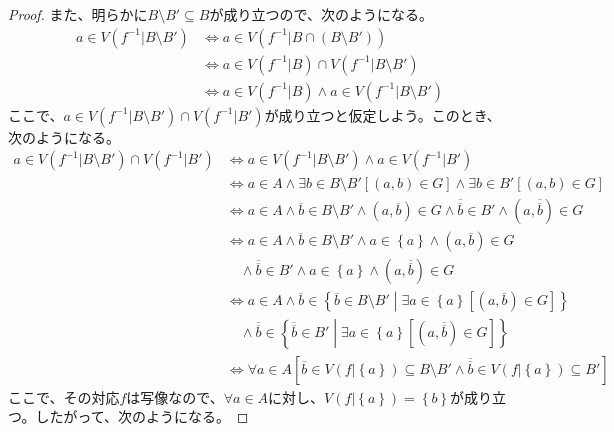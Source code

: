 \documentclass[a4paper]{jsarticle}
\begin{document}
\begin{proof}
また、明らかに$B \setminus B' \subseteq B$が成り立つので、次のようになる。
\begin{align*}
a \in V\left( f^{- 1}|B \setminus B' \right) &\Leftrightarrow a \in V\left( f^{- 1}|B \cap \left( B \setminus B' \right) \right)\\
&\Leftrightarrow a \in V\left( f^{- 1}|B \right) \cap V\left( f^{- 1}|B \setminus B' \right)\\
&\Leftrightarrow a \in V\left( f^{- 1}|B \right) \land a \in V\left( f^{- 1}|B \setminus B' \right)
\end{align*}
ここで、$a \in V\left( f^{- 1}|B \setminus B' \right) \cap V\left( f^{- 1}|B' \right)$が成り立つと仮定しよう。このとき、次のようになる。
\begin{align*}
a \in V\left( f^{- 1}|B \setminus B' \right) \cap V\left( f^{- 1}|B' \right) &\Leftrightarrow a \in V\left( f^{- 1}|B \setminus B' \right) \land a \in V\left( f^{- 1}|B' \right)\\
&\Leftrightarrow a \in A \land \exists b \in B \setminus B'\left[ (a,b) \in G \right] \land \exists b \in B'\left[ (a,b) \in G \right]\\
&\Leftrightarrow a \in A \land \overline{b} \in B \setminus B' \land \left( a,\overline{b} \right) \in G \land \overline{\overline{b}} \in B' \land \left( a,\overline{\overline{b}} \right) \in G\\
&\Leftrightarrow a \in A \land \overline{b} \in B \setminus B' \land a \in \left\{ a \right\} \land \left( a,\overline{b} \right) \in G \\
&\quad \land \overline{\overline{b}} \in B' \land a \in \left\{ a \right\} \land \left( a,\overline{\overline{b}} \right) \in G\\
&\Leftrightarrow a \in A \land \overline{b} \in \left\{ \overline{b} \in B \setminus B' \middle| \exists a \in \left\{ a \right\}\left[ \left( a,\overline{b} \right) \in G \right] \right\} \\
&\quad \land \overline{\overline{b}} \in \left\{ \overline{\overline{b}} \in B' \middle| \exists a \in \left\{ a \right\}\left[ \left( a,\overline{\overline{b}} \right) \in G \right] \right\}\\
&\Leftrightarrow \forall a \in A\left[ \overline{b} \in V\left( f|\left\{ a \right\} \right) \subseteq B \setminus B' \land \overline{\overline{b}} \in V\left( f|\left\{ a \right\} \right) \subseteq B' \right]
\end{align*}
ここで、その対応$f$は写像なので、$\forall a \in A$に対し、$V\left( f|\left\{ a \right\} \right) = \left\{ b \right\}$が成り立つ。したがって、次のようになる。

\end{proof}
\end{document}
